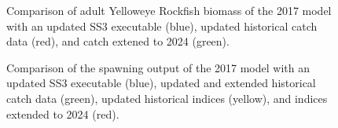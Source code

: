 \documentclass[
]{scrartcl}
\begin{document}
\begin{figure}


\caption{\label{fig-bridge3-comp18}Comparison of adult Yelloweye
Rockfish biomass of the 2017 model with an updated SS3 executable
(blue), updated historical catch data (red), and catch extened to 2024
(green).}

\end{figure}%

\begin{figure}


\caption{\label{fig-bridge5-comp2}Comparison of the spawning output of
the 2017 model with an updated SS3 executable (blue), updated and
extended historical catch data (green), updated historical indices
(yellow), and indices extended to 2024 (red).}

\end{figure}%
\end{document}
